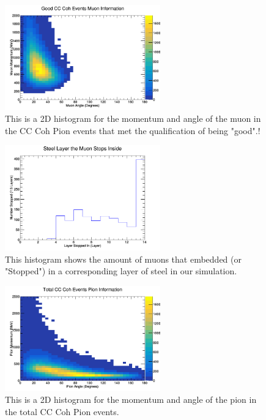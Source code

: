 \documentclass[11pt]{article}
\begin{document}
\begin{figure}[H]
\centering
\includegraphics[width=0.6\textwidth]{NewNMBergerSehgalImages/6-GoodCCCohMuonInfoNMBS.png}
\caption{This is a 2D histogram for the momentum and angle of the muon in the CC Coh Pion events that met the qualification of being "good".!}
\end{figure}

\begin{figure}[H]
\centering
\includegraphics[width=0.6\textwidth]{NewNMBergerSehgalImages/7-LayerPenetrationNMBS.png}
\caption{This histogram shows the amount of muons that embedded (or "Stopped") in a corresponding layer of steel in our simulation.}
\end{figure}

\begin{figure}[H]
\centering
\includegraphics[width=0.6\textwidth]{NewNMBergerSehgalImages/8-TotalCCCohPionInfoNMBS.png}
\caption{This is a 2D histogram for the momentum and angle of the pion in the total CC Coh Pion events.}
\end{figure}
\end{document}
